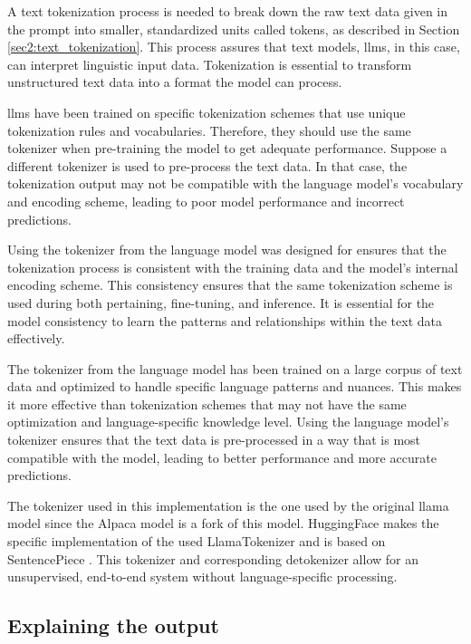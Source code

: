         A text tokenization process is needed to break down the raw text data given in the prompt into smaller, standardized units called tokens, as described in Section \ref{sec2:text_tokenization}. 
        This process assures that text models, \glspl{llm}, in this case, can interpret linguistic input data. Tokenization is essential to transform unstructured text data into a format the model can process.
        
        \glspl{llm} have been trained on specific tokenization schemes that use unique tokenization rules and vocabularies. Therefore, they should use the same tokenizer when pre-training the model to get adequate performance. Suppose a different tokenizer is used to pre-process the text data. In that case, the tokenization output may not be compatible with the language model's vocabulary and encoding scheme, leading to poor model performance and incorrect predictions.
        
        Using the tokenizer from the language model was designed for ensures that the tokenization process is consistent with the training data and the model's internal encoding scheme. 
        This consistency ensures that the same tokenization scheme is used during both pertaining, fine-tuning, and inference. It is essential for the model consistency to learn the patterns and relationships within the text data effectively. 
    
        The tokenizer from the language model has been trained on a large corpus of text data and optimized to handle specific language patterns and nuances. This makes it more effective than tokenization schemes that may not have the same optimization and language-specific knowledge level. 
        Using the language model's tokenizer ensures that the text data is pre-processed in a way that is most compatible with the model, leading to better performance and more accurate predictions.

        The tokenizer used in this implementation is the one used by the original \gls{llama} model \cite{touvronLLaMAOpenEfficient2023} since the Alpaca model is a fork of this model. HuggingFace \cite{HuggingFaceAI} makes the specific implementation of the used LlamaTokenizer  and is based on SentencePiece \cite{LLaMATokenizer, Sentencepiece}. 
        This tokenizer and corresponding detokenizer allow for an unsupervised, end-to-end system without language-specific processing. 



        \subsection{Explaining the output}

